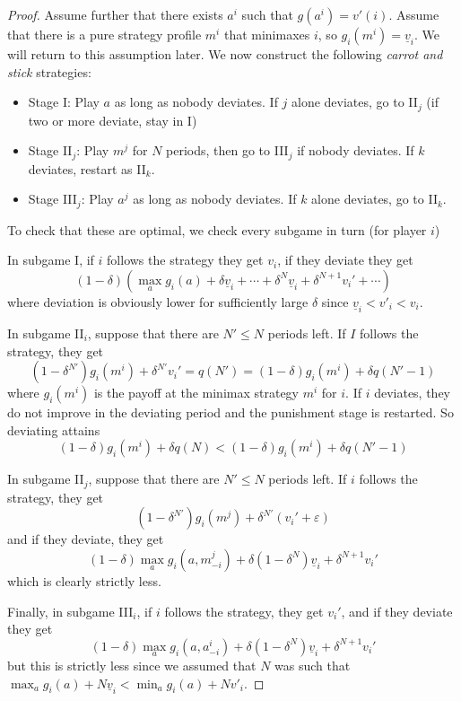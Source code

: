 \documentclass[10pt]{article}
\begin{document}
\begin{proof}
	Assume further that there exists $a^i$ such that $g(a^i) = v'(i)$. Assume that there is a pure strategy profile $m^i$ that minimaxes $i$, so $g_i(m^i) = \underline{v}_i$. We will return to this assumption later. We now construct the following \emph{carrot and stick} strategies:
	\begin{itemize}
		\item Stage I: Play $a$ as long as nobody deviates. If $j$ alone deviates, go to II$_j$ (if two or more deviate, stay in I)
		\item Stage II$_j$: Play $m^j$ for $N$ periods, then go to III$_j$ if nobody deviates. If $k$ deviates, restart as II$_k$.
		\item Stage III$_j$: Play $a^j$ as long as nobody deviates. If $k$ alone deviates, go to II$_k$.
	\end{itemize}
	To check that these are optimal, we check every subgame in turn (for player $i$)
	
	In subgame I, if $i$ follows the strategy they get $v_i$, if they deviate they get \[(1-\delta) (\max_a g_i(a) + \delta \underline{v}_i + \cdots + \delta^N \underline{v}_i + \delta^{N+1} v_i' + \cdots)\]where deviation is obviously lower for sufficiently large $\delta$ since $\underline{v}_i < v'_i < v_i$.
	
	In subgame II$_i$, suppose that there are $N' \le N$ periods left. If $I$ follows the strategy, they get \[(1-\delta^{N'}) g_i(m^i) + \delta^{N'}v_i' = q(N') = (1-\delta)g_i(m^i) + \delta q(N'-1)\]where $g_i(m^i)$ is the payoff at the minimax strategy $m^i$ for $i$. If $i$ deviates, they do not improve in the deviating period and the punishment stage is restarted. So deviating attains
	\[(1-\delta)g_i(m^i) + \delta q(N) < (1-\delta)g_i(m^i) + \delta q(N'-1)\]
	
	In subgame II$_j$, suppose that there are $N' \le N$ periods left. If $i$ follows the strategy, they get
	\[
	(1-\delta^{N'})g_i(m^j) + \delta^{N'}(v_i' + \varepsilon)
	\]and if they deviate, they get \[(1-\delta)\max_a g_i(a,m_{-i}^j) + \delta (1-\delta^N)\underline{v}_i + \delta^{N+1} v_i'\]which is clearly strictly less.
	
	Finally, in subgame III$_i$, if $i$ follows the strategy, they get $v_i'$, and if they deviate they get \[(1-\delta) \max_a g_i(a,a^i_{-i}) + \delta (1-\delta^N)\underline{v}_i + \delta^{N+1}v_i'\]but this is strictly less since we assumed that $N$ was such that $\max_a g_i(a) + N\underline{v}_i < \min_a g_i(a) + Nv'_i$.
\end{proof}
\end{document}
